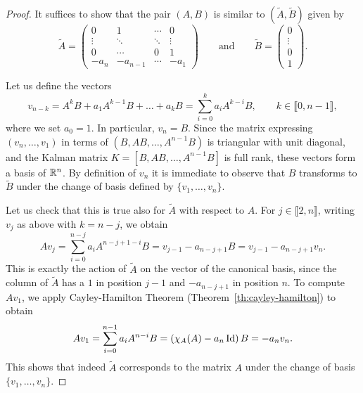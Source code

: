 \begin{proof}
    It suffices to show that the pair $(A,B)$ is similar to $(\tilde A, \tilde B)$ given by 
    \begin{equation}
        \tilde A = 
        \begin{pmatrix}
            0 & 1 &  \cdots & 0 \\
            \vdots & \ddots & \ddots & \vdots \\
            0 & \cdots &  0 & 1 \\
            -a_n & -a_{n-1} &  \cdots & -a_1 
        \end{pmatrix}
        \qquad\text{and}\qquad
        \tilde B = 
        \begin{pmatrix}
            0\\ \vdots \\ 0 \\ 1
        \end{pmatrix}.
    \end{equation} 
    
    Let us define the vectors
    \begin{equation}
        v_{n-k} = A^{k}B + a_1 A^{k-1}B + \ldots + a_{k}B = \sum_{i=0}^{k} a_i A^{k-i}B, \qquad k\in\llbracket 0,n-1\rrbracket,
    \end{equation}
    where we set $a_0=1$. In particular, $v_n=B$.
    Since the matrix expressing $(v_n,\ldots,v_1)$ in terms of $(B,AB,\ldots,A^{n-1}B)$ is triangular with unit diagonal, and the Kalman matrix $K = [B,AB,\ldots, A^{n-1}B]$ is full rank, these vectors form a basis of $\mathbb{R}^n$.
    By definition of $v_n$ it is immediate to observe that $B$ transforms to $\tilde B$ under the change of basis defined by $\{v_1,\ldots,v_n\}$.

    Let us check that this is true also for $\tilde A$ with respect to $A$.
    For $j\in \llbracket 2,n\rrbracket$, writing $v_j$ as above with $k=n-j$, we obtain
    \begin{equation}
        A v_{j} = \sum_{i=0}^{n-j} a_i A^{n-j+1-i}B = v_{j-1} - a_{n-j+1}B = v_{j-1} -a_{n-j+1} v_n .
    \end{equation}
    This is exactly the action of $\tilde A$ on the  vector of the canonical basis, since the  column of $\tilde A$ has a $1$ in position $j-1$ and $-a_{n-j+1}$ in position $n$.
    To compute $A v_1$, we apply Cayley-Hamilton Theorem (Theorem~\ref{th:cayley-hamilton}) to obtain
    \begin{equation}
        A v_1 = \sum_{i=0}^{n-1} a_i A^{n-i}B = \left( \chi_A(A) - a_n \operatorname{Id}\right) B = -a_n v_n.
    \end{equation}
    This shows that indeed $\tilde A$ corresponds to the matrix $A$ under the change of basis $\{v_1,\ldots,v_n\}$.
\end{proof}

